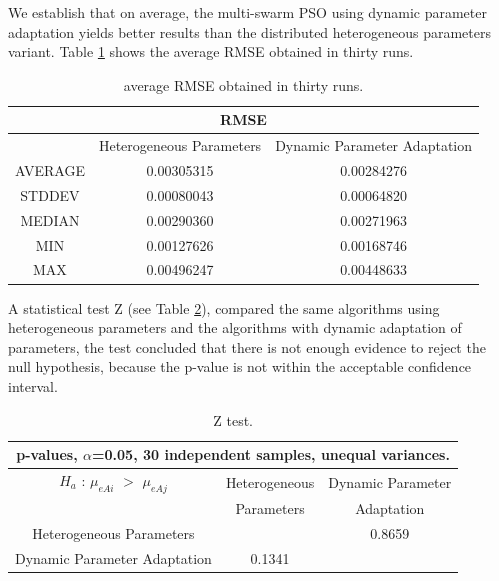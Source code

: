 \documentclass[runningheads]{llncs}
\begin{document}
We establish that on average, the multi-swarm PSO using dynamic parameter adaptation yields better results than the distributed heterogeneous parameters variant. Table \ref{tab:rmse} shows the average RMSE obtained in thirty runs.


\begin{table}[htbp]
    \caption{average RMSE obtained in thirty runs.} 
    \label{tab:rmse}
    \centering
    \setlength{\tabcolsep}{8pt}
    \begin{tabular}{|c|c|c|}      \hline
      \multicolumn{3}{|c|}{RMSE} \\ \hline
      & {Heterogeneous Parameters}  & {  Dynamic Parameter Adaptation} \\ \hline
    AVERAGE   & 0.00305315 & 0.00284276 \\ \hline
    STDDEV    & 0.00080043 & 0.00064820 \\ \hline   
    MEDIAN    & 0.00290360 & 0.00271963 \\ \hline 
    MIN       & 0.00127626 & 0.00168746 \\ \hline   
    MAX       & 0.00496247 & 0.00448633 \\ \hline    
   \end{tabular}
\end{table}

A statistical test Z (see Table \ref{tab:ztest}), compared the same algorithms using heterogeneous parameters and the algorithms with dynamic adaptation of parameters, the test concluded that there is not enough evidence to reject the null hypothesis, because the p-value is not within the acceptable confidence interval.

\begin{table}[htbp] 
  \caption{Z test.}
  \label{tab:ztest}
  \centering
  \setlength{\tabcolsep}{5pt}
  \begin{tabular}{|c|c|c|}  
  \hline
    \multicolumn{3}{|c|}{  p-values, $\alpha$=0.05, 30 independent samples,  unequal variances.}  \\ [1ex] \hline
    $H_a$ : $\mu_{eAi}$ $>$ $\mu_{eAj}$ &  Heterogeneous  & Dynamic Parameter   \\   
                                        & Parameters      &  Adaptation  \\   \hline
            Heterogeneous Parameters    & \cellcolor{lightgray}    & 0.8659  \\  \hline
         Dynamic Parameter Adaptation   &   0.1341  & \cellcolor{lightgray} \\ \hline    
  \end{tabular}
\end{table}
\end{document}
